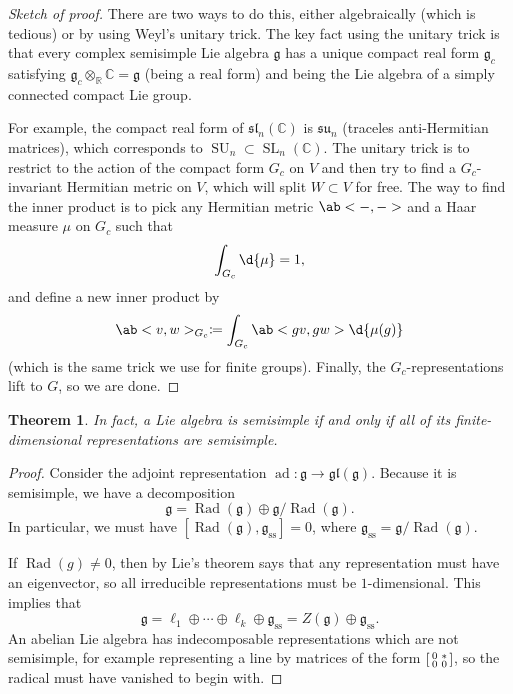 \documentclass{amsart}
\newtheorem{thm}{Theorem}[section]
\theoremstyle{definition}
\theoremstyle{remark}
\theoremstyle{plain}
\theoremstyle{definition}
\theoremstyle{remark}
\newcommand{\R}{\mathbb{R}}
\newcommand{\C}{\mathbb{C}}
\newcommand{\g}{\mathfrak{g}}
\newcommand{\mf}[1]{\mathfrak{#1}}
\newcommand{\mr}[1]{\mathrm{#1}}
\newcommand{\on}[1]{\operatorname{#1}}
\newcommand{\1}{\mathbf{1}}
\newcommand{\2}{\mathbf{2}}
\newcommand{\3}{\mathbf{3}}
\newcommand{\gl}{\mf{gl}}
\renewcommand{\sl}{\mf{sl}}
\DeclareMathOperator{\ad}{ad}
\begin{document}
\begin{proof}[Sketch of proof]
    There are two ways to do this, either algebraically (which is tedious) or by using Weyl's unitary trick. The key fact using the unitary trick is that every complex semisimple Lie algebra \(\g\) has a unique compact real form \(\g_c\) satisfying \(\g_c \otimes_{\R} \C = \g\) (being a real form) and being the Lie algebra of a simply connected compact Lie group.

    For example, the compact real form of \(\sl_n(\C)\) is \(\mf{su}_n\) (traceles anti-Hermitian matrices), which corresponds to \(\on{SU}_n \subset \on{SL}_n(\C)\). The unitary trick is to restrict to the action of the compact form \(G_c\) on \(V\) and then try to find a \(G_c\)-invariant Hermitian metric on \(V\), which will split \(W \subset V\) for free. The way to find the inner product is to pick any Hermitian metric \(\ab<-,->\) and a Haar measure \(\mu\) on \(G_c\) such that
    \[ \int_{G_c} \d{\mu} = 1, \] 
    and define a new inner product by
    \[ \ab<v,w>_{G_c} \coloneqq \int_{G_c} \ab<gv, gw> \d{\mu(g)} \]
    (which is the same trick we use for finite groups). Finally, the \(G_c\)-representations lift to \(G\), so we are done.
\end{proof}

\begin{thm}
    In fact, a Lie algebra is semisimple if and only if all of its finite-dimensional representations are semisimple.
\end{thm}

\begin{proof}
    Consider the adjoint representation \(\ad \colon \g \to \gl(\g)\). Because it is semisimple, we have a decomposition
    \[ \g = \on{Rad}(\g) \oplus \g/\on{Rad}(\g). \]
    In particular, we must have \([\on{Rad}(\g), \g_{\mr{ss}}] = 0\), where \(\g_{\mr{ss}} = \g / \on{Rad}(\g)\).

    If \(\on{Rad}(g) \neq 0\), then by Lie's theorem says that any representation must have an eigenvector, so all irreducible representations must be \(1\)-dimensional. This implies that
    \[ \g = \ell_1 \oplus \cdots \oplus \ell_k \oplus \g_{\on{ss}} = Z(\g) \oplus \g_{\mr{ss}}. \]
    An abelian Lie algebra has indecomposable representations which are not semisimple, for example representing a line by matrices of the form \( \begin{bsmallmatrix}
        0 & * \\
        0 & 0
    \end{bsmallmatrix}    \), so the radical must have vanished to begin with.
\end{proof}
\end{document}
